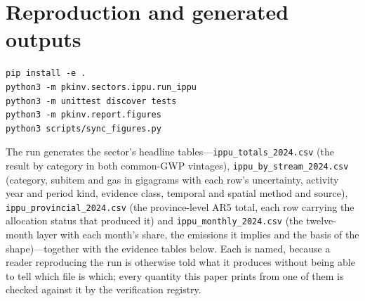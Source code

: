 \section{Reproduction and generated outputs}
\label{app:repro}

\begin{verbatim}
pip install -e .
python3 -m pkinv.sectors.ippu.run_ippu
python3 -m unittest discover tests
python3 -m pkinv.report.figures
python3 scripts/sync_figures.py
\end{verbatim}

The run generates the sector's headline tables---\texttt{ippu\_totals\_2024.csv} (the result by
category in both common-GWP vintages), \texttt{ippu\_by\_stream\_2024.csv} (category, subitem
and gas in gigagrams with each row's uncertainty, activity year and period kind,
evidence class, temporal and spatial method and source), \texttt{ippu\_provincial\_2024.csv}
(the province-level AR5 total, each row carrying the allocation status that produced it) and
\texttt{ippu\_monthly\_2024.csv} (the twelve-month layer with each month's share, the emissions
it implies and the basis of the shape)---together with the evidence tables below. Each is
named, because a reader reproducing the run is otherwise told what it produces without being
able to tell which file is which; every quantity this paper prints from one of them is checked
against it by the verification registry.

